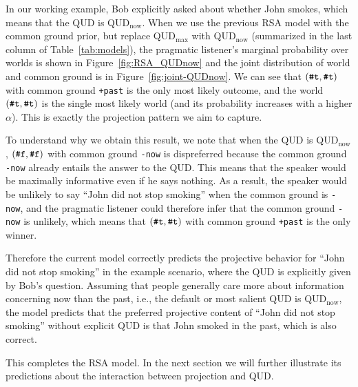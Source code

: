 In our working example, Bob explicitly asked about whether John smokes, 
 which means that the QUD is QUD$_\textrm{now}$.
When we use the previous RSA model with the common ground prior, but  
 replace QUD$_\textrm{max}$ with QUD$_\textrm{now}$ (summarized in the 
 last column of Table~\ref{tab:models}), the pragmatic listener's marginal probability over worlds is shown in Figure~\ref{fig:RSA_QUDnow} and the joint
 distribution of world and common ground is in Figure~\ref{fig:joint-QUDnow}.
We can see that $(\verb+#t+, \verb+#t+)$ with common ground \verb=+past= is 
 the only most likely outcome, and the world $(\verb+#t+, \verb+#t+)$ is the 
 single most likely world (and its probability increases with a higher $\alpha$).
This is exactly the projection pattern we aim to capture.

To understand why we obtain this result, we note that 
 when the QUD is QUD$_\textrm{now}$, $(\verb+#f+, \verb+#f+)$ with common ground
 \verb=-now= is dispreferred because the common ground \verb=-now= already entails 
 the answer to the QUD. 
This means that the speaker would be maximally informative even if he says nothing.
As a result, the speaker would be unlikely to say ``John did not stop smoking'' 
 when the common ground is \verb=-now=, and the pragmatic listener could therefore
 infer that the common ground \verb=-now= is unlikely, which means that 
 $(\verb+#t+, \verb+#t+)$ with common ground \verb=+past= is the only winner.


Therefore the current model correctly predicts the projective behavior for 
 ``John did not stop smoking'' in the example scenario, where the QUD is explicitly
 given by Bob's question. 
Assuming that people generally care more about information concerning now than 
 the past, i.e., the default or most salient QUD is QUD$_\text{now}$,
the model predicts that the preferred projective content of 
 ``John did not stop smoking'' without explicit QUD is that 
 John smoked in the past, which is also correct.

This completes the RSA model. In the next section we will further illustrate its predictions about the interaction between projection and QUD. 

